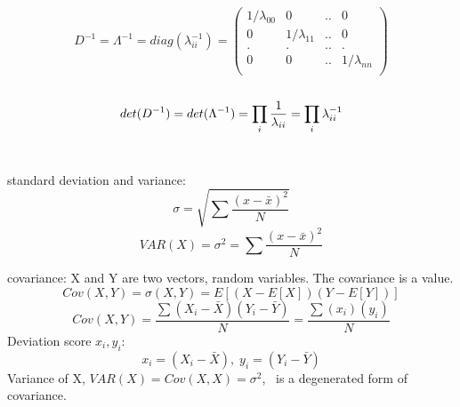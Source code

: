 \documentclass[a4paper,12pt]{article}
\begin{document}
\begin{compactitem}
\begin{equation}
\label{eq:pdpD}
D^{-1}=\Lambda^{-1}=diag(\lambda_{ii}^{-1})=
\begin{pmatrix}
       1/\lambda_{00}& 0 				& ..	&	0 	\\[0.3em]
       0 			& 1/\lambda_{11} & ..		&	0 	\\[0.3em]
       .			& .				& ..	&	.	\\[0.3em]
       0 			& 0 			& ..	&	1/\lambda_{nn}\\[0.3em]
\end{pmatrix}
\end{equation}\\
\begin{equation}
\label{eq:det-pdpD}
\\
det(D^{-1})=det(\Lambda^{-1})=
\prod_{i}^{} \frac{1}{\lambda_{ii} }\\
=\prod_{i}^{} \lambda_{ii}^{-1} \\
\end{equation}\\

\item standard deviation and variance:
\begin{equation}
\label{eq:std}
\sigma = \sqrt {\sum \frac{(x-\bar{x})^2}{N}}
\end{equation}
\begin{equation}
\label{eq:variance}
VAR(X)=\sigma^{2} = {\sum \frac{(x-\bar{x})^2}{N}}
\end{equation}

\item covariance: X and Y are two vectors, random variables. The covariance is a value.
\begin{equation}
\label{eq:covar}
Cov(X,Y)=\sigma(X,Y)=E[(X - E[X])(Y-E[Y])]
\end{equation}
\begin{equation}
\label{eq:covar1}
Cov(X,Y)=\frac{\sum(X_i-\bar{X})(Y_i-\bar{Y})}{N}=
\frac{\sum(x_i)(y_i)}{N}
\end{equation}
Deviation score $x_i, y_i$:
\begin{equation}
\label{eq:covar1}
x_{i}=(X_i-\bar{X}),\;
y_{i}=(Y_i-\bar{Y})
\end{equation}
Variance of X, $VAR(X)=Cov(X,X)=\sigma^{2}$, \ is a degenerated form of covariance.\\


\end{compactitem}
\end{document}

